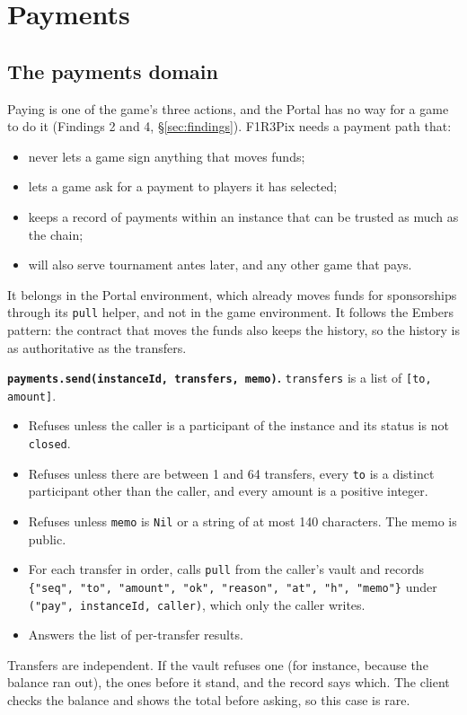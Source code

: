 \documentclass[11pt,a4paper]{article}
\newcommand{\code}[1]{\texttt{#1}}
\begin{document}
\section{Payments}\label{sec:pay}

\subsection{The payments domain}

Paying is one of the game's three actions, and the Portal has no way for a game to do it
(Findings 2 and 4, \S\ref{sec:findings}). F1R3Pix needs a payment path that:

\begin{itemize}[leftmargin=1.2em,itemsep=1pt]
\item never lets a game sign anything that moves funds;
\item lets a game ask for a payment to players it has selected;
\item keeps a record of payments within an instance that can be trusted as much as the chain;
\item will also serve tournament antes later, and any other game that pays.
\end{itemize}

It belongs in the Portal environment, which already moves funds for sponsorships through its
\code{pull} helper, and not in the game environment. It follows the Embers pattern: the
contract that moves the funds also keeps the history, so the history is as authoritative as
the transfers.

\textbf{\code{payments.send(instanceId, transfers, memo)}.} \code{transfers} is a list of
\code{[to, amount]}.
\begin{itemize}[leftmargin=1.2em,itemsep=1pt]
\item Refuses unless the caller is a participant of the instance and its status is not
  \code{closed}.
\item Refuses unless there are between 1 and 64 transfers, every \code{to} is a distinct
  participant other than the caller, and every amount is a positive integer.
\item Refuses unless \code{memo} is \code{Nil} or a string of at most 140 characters. The memo
  is public.
\item For each transfer in order, calls \code{pull} from the caller's vault and records
  \code{\{"seq", "to", "amount", "ok", "reason", "at", "h", "memo"\}} under
  \code{("pay", instanceId, caller)}, which only the caller writes.
\item Answers the list of per-transfer results.
\end{itemize}
Transfers are independent. If the vault refuses one (for instance, because the balance ran
out), the ones before it stand, and the record says which. The client checks the balance and
shows the total before asking, so this case is rare.
\end{document}
